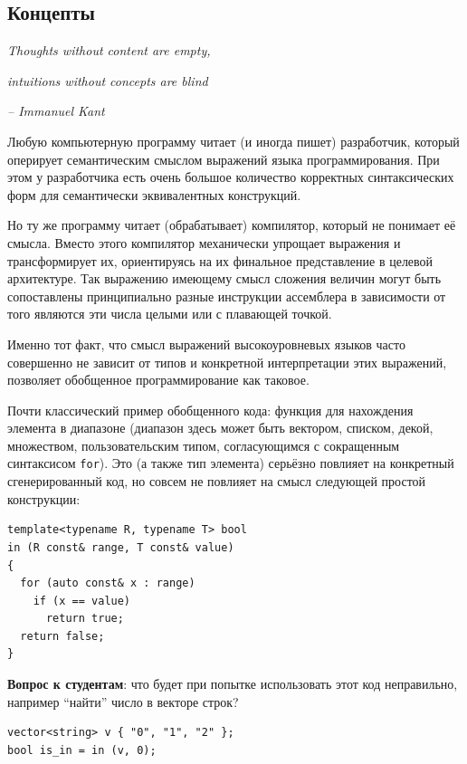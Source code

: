 \documentclass[a4paper,12pt,oneside]{article}
\begin{document}
\pagebreak
\subsection{Концепты}\label{Concepts}

\hfill\textit{Thoughts without content are empty,}

\hfill\textit{intuitions without concepts are blind}{\vspace{0.5em}}

\hfill\textit{-- Immanuel Kant}

Любую компьютерную программу читает (и иногда пишет) разработчик, который оперирует семантическим смыслом выражений языка программирования. При этом у разработчика есть очень большое количество корректных синтаксических форм для семантически эквивалентных конструкций.

Но ту же программу читает (обрабатывает) компилятор, который не понимает её смысла. Вместо этого компилятор механически упрощает выражения и трансформирует их, ориентируясь на их финальное представление в целевой архитектуре. Так выражению имеющему смысл сложения величин могут быть сопоставлены принципиально разные инструкции ассемблера в зависимости от того являются эти числа целыми или с плавающей точкой.

Именно тот факт, что смысл выражений высокоуровневых языков часто совершенно не зависит от типов и конкретной интерпретации этих выражений, позволяет обобщенное программирование как таковое.

Почти классический пример обобщенного кода: функция для нахождения элемента в диапазоне (диапазон здесь может быть вектором, списком, декой, множеством, пользовательским типом, согласующимся с сокращенным синтаксисом \lstinline!for!). Это (а также тип элемента) серьёзно повлияет на конкретный сгенерированный код, но совсем не повлияет на смысл следующей простой конструкции:

\begin{lstlisting}
template<typename R, typename T> bool 
in (R const& range, T const& value) 
{
  for (auto const& x : range)
    if (x == value)
      return true;
  return false;
}
\end{lstlisting}

\textbf{Вопрос к студентам}: что будет при попытке использовать этот код неправильно, например ``найти'' число в векторе строк?

\begin{lstlisting}
vector<string> v { "0", "1", "2" };
bool is_in = in (v, 0);
\end{lstlisting}
\end{document}

